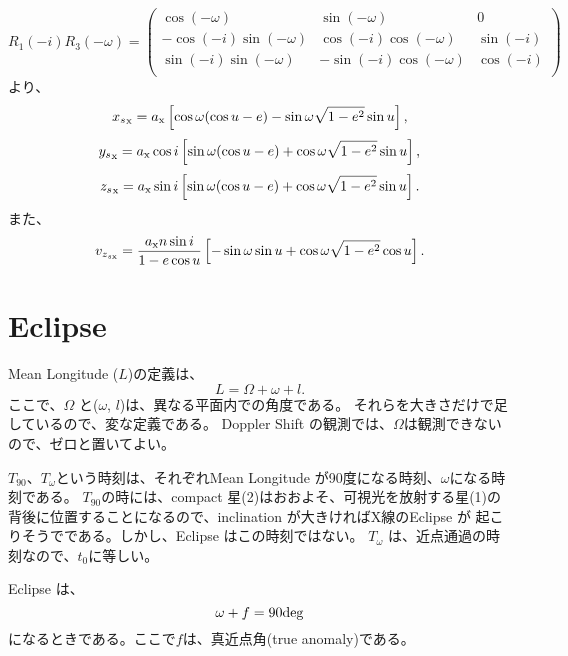 \begin{equation}
R_1(-i) R_3(-\omega) =
\left( \begin{array}{ccc}
\cos(- \omega) &  \sin(- \omega) & 0 \\
-\cos(-i) \sin(- \omega) &  \cos(-i) \cos(-\omega) & \sin(-i) \\
\sin(-i) \sin(-\omega) & - \sin(-i) \cos(-\omega) & \cos(-i) \\
\end{array}
\right)
\end{equation}
より、
%
\begin{equation}
{x_s}_{\rm x} = a_{\rm x} 
\left[ \cos \omega (\cos u - e)
 - \sin \omega \sqrt{1 - e^2} \sin u
\right],
\end{equation}
%
\begin{equation}
{y_s}_{\rm x} = a_{\rm x} \cos i
\left[ \sin \omega (\cos u - e)
 + \cos \omega \sqrt{1 - e^2} \sin u
\right],
\end{equation}
%
\begin{equation}
{z_s}_{\rm x} = a_{\rm x} \sin i 
\left[ \sin \omega (\cos u - e)
 + \cos \omega \sqrt{1 - e^2} \sin u
\right].
\end{equation}
%
また、
\begin{equation}
v_{z_{s \rm x}} = \frac{a_{\rm x} n \sin i}{1 - e \cos u}
\left[ - \sin \omega \sin u
 + \cos \omega \sqrt{1 - e^2} \cos u
\right].
\end{equation}

\section{Eclipse}

Mean Longitude ($L$)の定義は、
\begin{equation}
L = \Omega + \omega + l.
\end{equation}
ここで、$\Omega$ と($\omega$, $l$)は、異なる平面内での角度である。
それらを大きさだけで足しているので、変な定義である。
Doppler Shift の観測では、$\Omega$は観測できないので、ゼロと置いてよい。

$T_{90}$、$T_{\omega}$という時刻は、それぞれMean Longitude 
が90度になる時刻、$\omega$になる時刻である。
$T_{90}$の時には、compact 星(2)はおおよそ、可視光を放射する星(1)の
背後に位置することになるので、inclination が大きければX線のEclipse が
起こりそうでである。しかし、Eclipse はこの時刻ではない。
$T_{\omega}$ は、近点通過の時刻なので、$t_0$に等しい。

Eclipse は、
\begin{equation}
  \omega + f = 90 {\rm deg}
\end{equation}
になるときである。ここで$f$は、真近点角(true anomaly)である。


